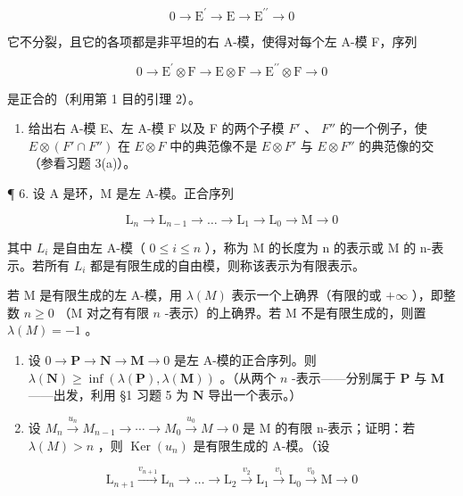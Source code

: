 \[
0 \rightarrow \mathrm{E} ^ {\prime} \rightarrow \mathrm{E} \rightarrow \mathrm{E} ^ {\prime \prime} \rightarrow 0
\]

它不分裂，且它的各项都是非平坦的右 A-模，使得对每个左 A-模 F，序列

\[
0 \rightarrow \mathrm{E} ^ {\prime} \otimes \mathrm{F} \rightarrow \mathrm{E} \otimes \mathrm{F} \rightarrow \mathrm{E} ^ {\prime \prime} \otimes \mathrm{F} \rightarrow 0
\]

是正合的（利用第 1 目的引理 2）。

\begin{enumerate}
\def\labelenumi{\arabic{enumi}.}
\setcounter{enumi}{4}
\tightlist
\item
  给出右 A-模 E、左 A-模 F 以及 F 的两个子模 \(F'\) 、 \(F''\) 的一个例子，使 \(E \otimes (F' \cap F'')\) 在 \(E \otimes F\) 中的典范像不是 \(E \otimes F'\) 与 \(E \otimes F''\) 的典范像的交（参看习题 3(a)）。
\end{enumerate}

¶ 6. 设 A 是环，M 是左 A-模。正合序列

\[
\mathrm{L} _ {n} \rightarrow \mathrm{L} _ {n - 1} \rightarrow \dots \rightarrow \mathrm{L} _ {1} \rightarrow \mathrm{L} _ {0} \rightarrow \mathrm{M} \rightarrow 0
\]

其中 \(L_{i}\) 是自由左 A-模（ \(0 \leqslant i \leqslant n\) ），称为 M 的长度为 n 的表示或 M 的 n-表示。若所有 \(L_{i}\) 都是有限生成的自由模，则称该表示为有限表示。

若 M 是有限生成的左 A-模，用 \(\lambda(M)\) 表示一个上确界（有限的或 \(+\infty\) ），即整数 \(n \geqslant 0\) （M 对之有有限 \(n\) -表示）的上确界。若 M 不是有限生成的，则置 \(\lambda(M) = -1\) 。

\begin{enumerate}
\def\labelenumi{(\alph{enumi})}
\item
  设 \(0 \to \mathbf{P} \to \mathbf{N} \to \mathbf{M} \to 0\) 是左 A-模的正合序列。则 \(\lambda(\mathbf{N}) \geqslant \inf(\lambda(\mathbf{P}), \lambda(\mathbf{M}))\) 。（从两个 \(n\) -表示——分别属于 \(\mathbf{P}\) 与 \(\mathbf{M}\) ——出发，利用 §1 习题 5 为 \(\mathbf{N}\) 导出一个表示。）
\item
  设 \(M_{n} \xrightarrow{u_{n}} M_{n-1} \rightarrow \cdots \rightarrow M_{0} \xrightarrow{u_{0}} M \rightarrow 0\) 是 M 的有限 n-表示；证明：若 \(\lambda(M) > n\) ，则 \(\operatorname{Ker}(u_{n})\) 是有限生成的 A-模。（设
\end{enumerate}

\[
\mathrm{L} _ {n + 1} \xrightarrow {v _ {n + 1}} \mathrm{L} _ {n} \longrightarrow \dots \longrightarrow \mathrm{L} _ {2} \xrightarrow {v _ {2}} \mathrm{L} _ {1} \xrightarrow {v _ {1}} \mathrm{L} _ {0} \xrightarrow {v _ {0}} \mathrm{M} \longrightarrow 0
\]

